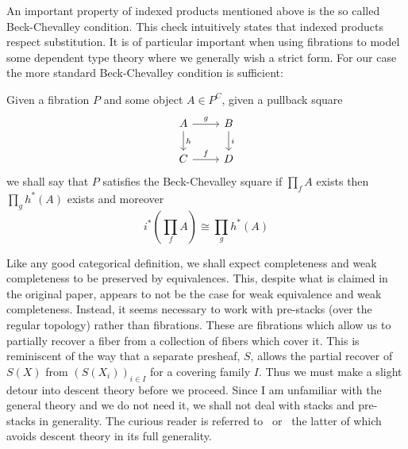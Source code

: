 An important property of indexed products mentioned above is the so
called Beck-Chevalley condition. This check intuitively states that
indexed products respect substitution. It is of particular important
when using fibrations to model some dependent type theory where we
generally wish a strict form. For our case the more standard
Beck-Chevalley condition is sufficient:
\begin{defn}\label{defn:complete:beckchevalley}
  Given a fibration $P$ and some object $A \in P^C$, given a pullback
  square
  \[
    \begin{tikzcd}
      A \ar[d, "h"] \ar[r, "g"] & B \ar[d, "i"]\\
      C \ar[r, "f"] & D
    \end{tikzcd}
  \]
  we shall say that $P$ satisfies the Beck-Chevalley square if
  $\prod_f A$ exists then $\prod_g h^*(A)$ exists and moreover
  \[
    i^*(\prod_f A) \cong \prod_g h^*(A)
  \]
\end{defn}
Like any good categorical definition, we shall expect completeness and
weak completeness to be preserved by equivalences. This, despite what
is claimed in the original paper, appears to not be the case for weak
equivalence and weak completeness. Instead, it seems necessary to work
with pre-stacks (over the regular topology) rather than
fibrations. These are fibrations which allow us to partially recover a
fiber from a collection of fibers which cover it. This is reminiscent
of the way that a separate presheaf, $S$, allows the partial recover
of $S(X)$ from $(S(X_i))_{i \in I}$ for a covering family $I$. Thus we
must make a slight detour into descent theory before we proceed. Since
I am unfamiliar with the general theory and we do not need it, we
shall not deal with stacks and pre-stacks in generality. The curious
reader is referred to~\citet{Vistoli:04} or~\citet{Frey:14} the latter
of which avoids descent theory in its full generality.

